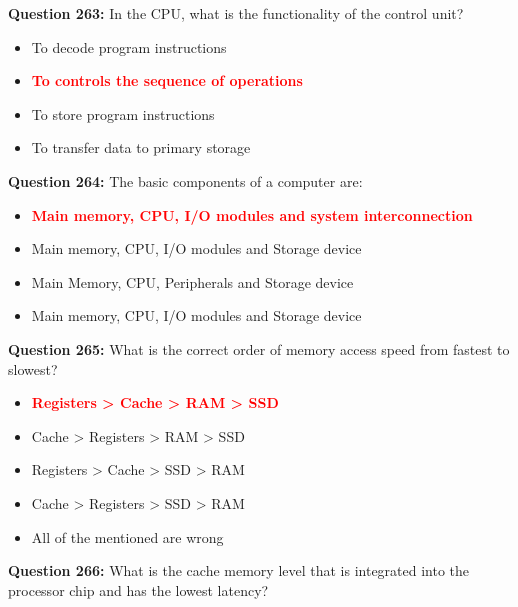 \documentclass[12pt,a4paper]{article}
\begin{document}
\vspace{0.5cm}

\textbf{Question 263:} In the CPU, what is the functionality of the control unit?

\begin{itemize}
    \item[\textbf{A.}] To decode program instructions
    \item[\textbf{B.}] \textcolor{red}{\textbf{To controls the sequence of operations}}
    \item[\textbf{C.}] To store program instructions
    \item[\textbf{D.}] To transfer data to primary storage
\end{itemize}

\vspace{0.5cm}

\textbf{Question 264:} The basic components of a computer are:

\begin{itemize}
    \item[\textbf{A.}] \textcolor{red}{\textbf{Main memory, CPU, I/O modules and system interconnection}}
    \item[\textbf{B.}] Main memory, CPU, I/O modules and Storage device
    \item[\textbf{C.}] Main Memory, CPU, Peripherals and Storage device
    \item[\textbf{D.}] Main memory, CPU, I/O modules and Storage device
\end{itemize}

\vspace{0.5cm}

\textbf{Question 265:} What is the correct order of memory access speed from fastest to slowest?

\begin{itemize}
    \item[\textbf{A.}] \textcolor{red}{\textbf{Registers > Cache > RAM > SSD}}
    \item[\textbf{B.}] Cache > Registers > RAM > SSD
    \item[\textbf{C.}] Registers > Cache > SSD > RAM
    \item[\textbf{D.}] Cache > Registers > SSD > RAM
    \item[\textbf{E.}] All of the mentioned are wrong
\end{itemize}

\vspace{0.5cm}

\textbf{Question 266:} What is the cache memory level that is integrated into the processor chip and has the lowest latency?
\end{document}
